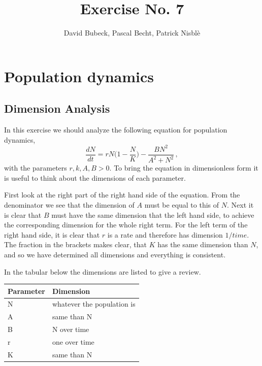 \documentclass[11pt, a4paper, reqno]{scrartcl}
\begin{document}
    \title{Exercise No. 7}
    \author{David Bubeck, Pascal Becht, Patrick Nisbl\`e}
    \maketitle
    

	 \section{Population dynamics}
		 \subsection{Dimension Analysis}
		 
		 In this exercise we should analyze the following equation for population dynamics,
		 \begin{equation}
		 \frac{dN}{dt} = r N \bigg(1 - \frac{N}{K} \bigg) - \frac{B N^2}{A^2 + N^2}\, ,
		 \end{equation}
		 with the parameters $r, k, A, B > 0$.
		 To bring the equation in dimensionless form it is useful to think about the dimensions of each parameter. 
		 
		 First look at the right part of the right hand side of the equation. 
		 From the denominator we see that the dimension of $A$ must be equal to this of $N$.
		 Next it is clear that $B$ must have the same dimension that the left hand side, to achieve the corresponding dimension for the whole right term. 
		 For the left term of the right hand side, it is clear that $r$ is a rate and therefore has dimension $1/time$. The fraction in the brackets makes clear, that $K$ has the same dimension than $N$, and so we have determined all dimensions and everything is consistent.
		 
		 In the tabular below the dimensions are listed to give a review.
		 \vspace{5pt}
		 \begin{center}
		 	\begin{tabular}{ll}
		 		\hline
		 		Parameter&Dimension\\
		 		\hline
		 		N&whatever the population is\\
		 		A&same than N\\
		 		B&N over time\\
		 		r&one over time\\
		 		K&same than N\\
		 		\hline
		 	\end{tabular}
		 \end{center}
		 \vspace{10pt}
		 
\end{document}
